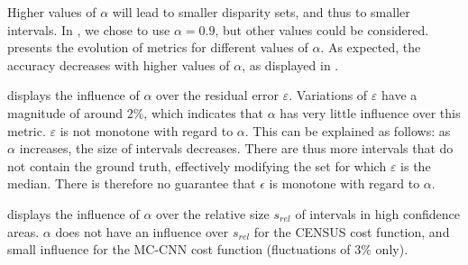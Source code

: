 Higher values of $\alpha$ will lead to smaller disparity sets, and thus to smaller intervals. In , we chose to use $\alpha=0.9$, but other values could be considered.  presents the evolution of metrics for different values of $\alpha$. As expected, the accuracy decreases with higher values of $\alpha$, as displayed in .

 displays the influence of $\alpha$ over the residual error $\varepsilon$. Variations of $\varepsilon$ have a magnitude of around $2\%$, which indicates that $\alpha$ has very little influence over this metric. $\varepsilon$ is not monotone with regard to $\alpha$. This can be explained as follows: as $\alpha$ increases, the size of intervals decreases. There are thus more intervals that do not contain the ground truth, effectively modifying the set for which $\varepsilon$ is the median. There is therefore no guarantee that $\epsilon$ is monotone with regard to $\alpha$. 

 displays the influence of $\alpha$ over the relative size $s_{rel}$ of intervals in high confidence areas. $\alpha$ does not have an influence over $s_{rel}$ for the CENSUS cost function, and small influence for the MC-CNN cost function (fluctuations of $3\%$ only). 

